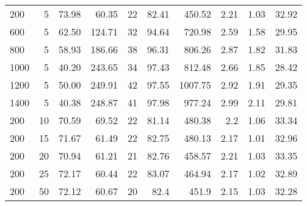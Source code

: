 \begin{table}[H]
{{\begin{tabular}{lrrrrrrrrr}
                \hline
                200        & 5                    & 73.98             & 60.35           & 22       & 82.41          & 450.52                     & 2.21      & 1.03              & 32.92                    \\
                600        & 5                    & 62.50             & 124.71          & 32       & 94.64          & 720.98                     & 2.59      & 1.58              & 29.95                    \\
                800        & 5                    & 58.93             & 186.66          & 38       & 96.31          & 806.26                     & 2.87      & 1.82              & 31.83                    \\
                1000       & 5                    & 40.20             & 243.65          & 34       & 97.43          & 812.48                     & 2.66      & 1.85              & 28.42                    \\
                1200       & 5                    & 50.00             & 249.91          & 42       & 97.55          & 1007.75                    & 2.92      & 1.91              & 29.35                    \\
                1400       & 5                    & 40.38             & 248.87          & 41       & 97.98          & 977.24                     & 2.99      & 2.11              & 29.81                    \\
                \hline
                200        & 10                   & 70.59             & 69.52           & 22       & 81.14          & 480.38                     & 2.2       & 1.06              & 33.34                    \\
                200        & 15                   & 71.67             & 61.49           & 22       & 82.75          & 480.13                     & 2.17      & 1.01              & 32.96                    \\
                200        & 20                   & 70.94             & 61.21           & 21       & 82.76          & 458.57                     & 2.21      & 1.03              & 33.35                    \\
                200        & 25                   & 72.17             & 60.44           & 22       & 83.07          & 464.94                     & 2.17      & 1.02              & 32.89                    \\
                \hline
                200        & 50                   & 72.12             & 60.67           & 20       & 82.4           & 451.9                      & 2.15      & 1.03              & 32.28                    \\

\end{tabular}}}
\end{table}
